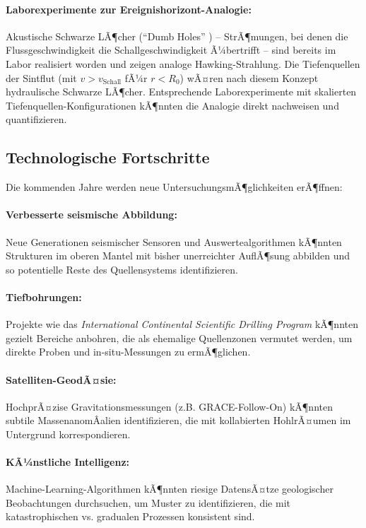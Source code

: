 ﻿\documentclass[12pt,a4paper]{report}
\begin{document}
\paragraph{Laborexperimente zur Ereignishorizont-Analogie:}
Akustische Schwarze LÃ¶cher (``Dumb Holes'' \cite{painleve1921}) -- StrÃ¶mungen, bei denen die Flussgeschwindigkeit die Schallgeschwindigkeit Ã¼bertrifft -- sind bereits im Labor realisiert worden und zeigen analoge Hawking-Strahlung. Die Tiefenquellen der Sintflut (mit $v > v_{\mathrm{Schall}}$ fÃ¼r $r < R_0$) wÃ¤ren nach diesem Konzept hydraulische Schwarze LÃ¶cher. Entsprechende Laborexperimente mit skalierten Tiefenquellen-Konfigurationen kÃ¶nnten die Analogie direkt nachweisen und quantifizieren.

\subsection{Technologische Fortschritte}

Die kommenden Jahre werden neue UntersuchungsmÃ¶glichkeiten erÃ¶ffnen:

\paragraph{Verbesserte seismische Abbildung:}
Neue Generationen seismischer Sensoren und Auswertealgorithmen kÃ¶nnten Strukturen im oberen Mantel mit bisher unerreichter AuflÃ¶\-sung abbilden und so potentielle Reste des Quellensystems identifizieren.

\paragraph{Tiefbohrungen:}
Projekte wie das \textit{International Continental Scientific Drilling Program} kÃ¶nnten gezielt Bereiche anbohren, die als ehemalige Quellenzonen vermutet werden, um direkte Proben und in-situ-Messungen zu ermÃ¶glichen.

\paragraph{Satelliten-GeodÃ¤sie:}
HochprÃ¤zise Gravitationsmessungen (z.B. GRACE-Follow-On) kÃ¶nnten subtile MassenanomÂ­alien identifizieren, die mit kollabierten HohlrÃ¤umen im Untergrund korrespondieren.

\paragraph{KÃ¼nstliche Intelligenz:}
Machine-Learning-Algorithmen kÃ¶nnten riesige DatensÃ¤tze geologischer Beobachtungen durchsuchen, um Muster zu identifizieren, die mit katastrophischen vs. gradualen Prozessen konsistent sind.
\end{document}
